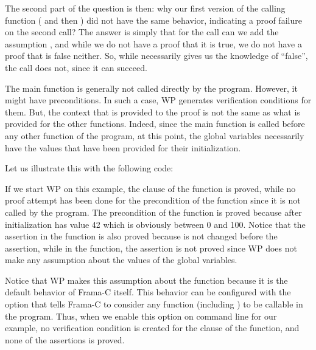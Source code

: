 The second part of the question is then: why our first version of the
calling function ( and then ) did
not have the same behavior, indicating a proof failure on the second
call? The answer is simply that for the call  can we add
the assumption , and while we do not have a proof
that it is true, we do not have a proof that is false neither. So, while
 necessarily gives us the knowledge of ``false'',
the call  does not, since it can succeed.




The main function is generally not called directly by the program. However,
it might have preconditions. In such a case, WP generates verification
conditions for them. But, the context that is provided to the proof is not
the same as what is provided for the other functions. Indeed, since the main
function is called before any other function of the program, at this point, the
global variables necessarily have the values that have been provided for their
initialization.

Let us illustrate this with the following code:




If we start WP on this example, the  clause of the
 function is proved, while no proof attempt has been done for
the precondition of the  function since it is not called by the
program. The precondition of the  function is proved because
after initialization  has value 42 which is obviously between
0 and 100. Notice that the assertion in the  function is also
proved because  is not changed before the assertion, while in the
 function, the assertion is not proved since WP does not make any
assumption about the values of the global variables.




Notice that WP makes this assumption about the  function
because it is the default behavior of Frama-C itself. This behavior can be
configured with the option  that tells Frama-C to
consider any function (including ) to be callable in the
program. Thus, when we enable this option on command line for our example, no
verification condition is created for the  clause of the
 function, and none of the assertions is proved.



